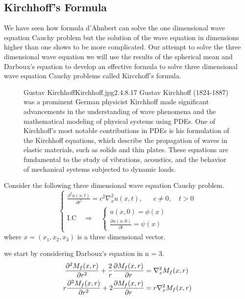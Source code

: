 \documentclass[]{article}
\begin{document}
\subsection{Kirchhoff's Formula}
We have seen how formula d'Almbert can solve the one dimensional wave equation Cauchy problem but the solution of the wave equation in dimensions higher than one shows to be more complicated. 
Our attempt to solve the three dimensional wave equation 
we will use the results of the spherical mean and Darboux's equation to develop an effective formula to solve three dimensional wave equation Cauchy problems called Kircchoff's formula.
\par
\begin{figure}[b]
    \begin{enrichment}{Gustav Kirchhoff}{Kirchhoff.jpg}{2.4}{.8}{.17}
        Gustav Kirchhoff (1824-1887) was a prominent German physicist
        Kirchhoff made significant advancements in the understanding of wave phenomena and the mathematical modeling of physical systems using PDEs.
        One of Kirchhoff's most notable contributions in PDEs is his formulation of the Kirchhoff equations, which describe the propagation of waves in elastic materials, such as solids and thin plates. These equations are fundamental to the study of vibrations, acoustics, and the behavior of mechanical systems subjected to dynamic loads.
    \end{enrichment}    
\end{figure}
Consider the following three dimensional wave equation Cauchy problem.
\begin{equation}
    \begin{cases}
        \displaystyle \frac{\partial^2 u(x,t)}{\partial t^2} = c^2 \nabla_{x}^{2}u(x,t), \quad\;\; c\neq 0 ,\quad t > 0
        \\
        \text{I.C} \quad \Longrightarrow \quad 
        \begin{cases}
            u\left(x,0 \right) = \phi\left(x\right)
            \\
            \displaystyle \frac{\partial u\left(x,0 \right)}{\partial t} = \psi\left(x\right)
        \end{cases} 
    \end{cases}
\end{equation}
where $x = (x_1,x_2,x_3)$ is a three dimensional vector.
\par
we start by considering Darboux's equation in n = 3.
\begin{align}
\frac{\partial^2 M_f (x,r)}{\partial r^2} + \frac{2}{r} \frac{\partial M_f (x,r)}{\partial r} &= \nabla_{x}^{2} M_f (x,r) \notag
\\ 
r\frac{\partial^2 M_f (x,r)}{\partial r^2} + 2 \frac{\partial M_f (x,r)}{\partial r} &= r\nabla_{x}^{2} M_f (x,r)
\end{align}
\end{document}
